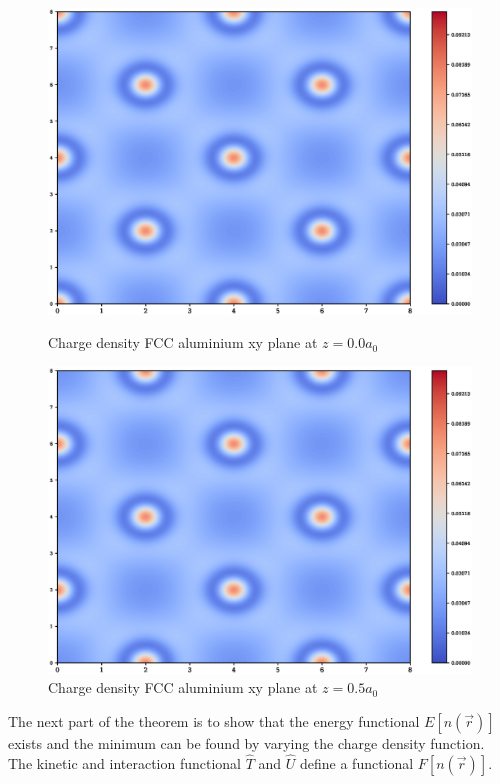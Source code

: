 \FloatBarrier
\begin{figure}[!htb]
\includegraphics[width=\linewidth]{chapters/background_potential_fitting/images/layer0000.eps}
\caption{Charge density FCC aluminium xy plane at $z=0.0 a_0$}
\label{fig:cdalfcc1}
\endminipage\hfill
{}
\includegraphics[width=\linewidth]{chapters/background_potential_fitting/images/layer0050.eps}
\caption{Charge density FCC aluminium xy plane at $z=0.5 a_0$}
\label{fig:cdalfcc2}
\endminipage
\end{figure}


The next part of the theorem is to show that the energy functional $E[n(\vec{r})]$ exists and the minimum can be found by varying the charge density function.  The kinetic and interaction functional $\hat{T}$ and $\hat{U}$ define a functional $F[n(\vec{r})]$.

